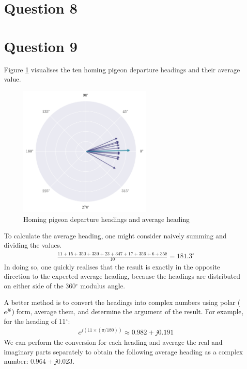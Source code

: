\documentclass[a4paper, 11pt]{article}
\begin{document}
\newpage
\section*{Question 8}

\newpage
\section*{Question 9}

Figure \ref{fig:q9_headings} visualises the ten homing pigeon departure headings
and their average value.

\begin{figure}[ht]
    \centering
    \includegraphics[width=0.6\textwidth]{images/q9_headings.png}
    \caption{Homing pigeon departure headings and average heading}
    \label{fig:q9_headings}
\end{figure}

To calculate the average heading, one might consider naively summing and
dividing the values.
\begin{align*}
    \frac{11+15+350+330+23+347+17+356+6+358}{10} = 181.3^\circ
\end{align*}
In doing so, one quickly realises that the result is exactly in the opposite
direction to the expected average heading, because the headings are distributed
on either side of the 360$^\circ$ modulus angle.

A better method is to convert the headings into complex numbers using polar
($e^{j\theta}$) form, average them, and determine the argument of the result.
For example, for the heading of 11$^\circ$:
\begin{align*}
    e^{j(11\times(\pi/180))} \approx 0.982+j0.191
\end{align*}
We can perform the conversion for each heading and average the real and
imaginary parts separately to obtain the following average heading as a complex
number: $0.964+j0.023$.
\end{document}
